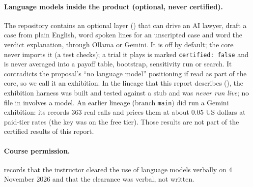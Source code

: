 \paragraph{Language models inside the product (optional, never certified).} The repository contains an optional layer () that can drive an AI lawyer, draft a case from plain English, word spoken lines for an unscripted case and word the verdict explanation, through Ollama or Gemini. It is off by default; the core never imports it (a test checks); a trial it plays is marked \texttt{certified: false} and is never averaged into a payoff table, bootstrap, sensitivity run or search. It contradicts the proposal's ``no language model'' positioning if read as part of the core, so we call it an exhibition. In the lineage that this report describes (), the exhibition harness was built and tested against a stub and was \emph{never run live}; no file in  involves a model. An earlier lineage (branch \texttt{main}) did run a Gemini exhibition: its  records 363 real calls and prices them at about 0.05 US dollars at paid-tier rates (the key was on the free tier). Those results are not part of the certified results of this report.

\paragraph{Course permission.}  records that the instructor cleared the use of language models verbally on 4 November 2026 and that the clearance was verbal, not written. 

